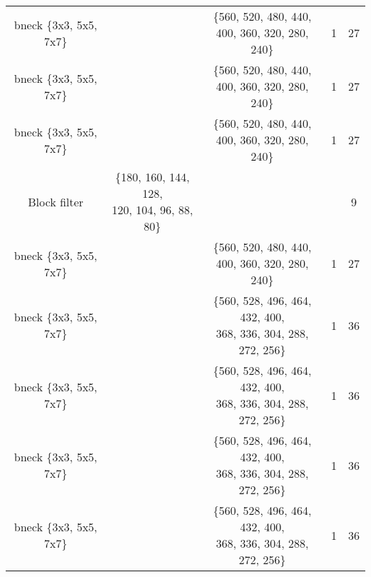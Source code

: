 \begin{table}
\begin{center}
\begin{tabular}[hp]{c|c|c|c|c}
  bneck \{3x3, 5x5, 7x7\} & &\shortstack{\{560, 520, 480, 440, \\ 400, 360, 320, 280, 240\}} &1 &27 \\
  bneck \{3x3, 5x5, 7x7\} & &\shortstack{\{560, 520, 480, 440, \\ 400, 360, 320, 280, 240\}} &1 &27 \\
  bneck \{3x3, 5x5, 7x7\} & &\shortstack{\{560, 520, 480, 440, \\ 400, 360, 320, 280, 240\}} &1 &27\\
\hline
Block filter &\shortstack{\{180, 160, 144, 128, \\ 120, 104, 96, 88, 80\}} & & &9\\
  bneck \{3x3, 5x5, 7x7\} & &\shortstack{\{560, 520, 480, 440, \\400, 360, 320, 280, 240\}} &1 &27\\
  bneck \{3x3, 5x5, 7x7\} & &\shortstack{\{560, 528, 496, 464, 432, 400, \\  368, 336, 304, 288, 272, 256\}} &1 &36 \\
  bneck \{3x3, 5x5, 7x7\} & &\shortstack{\{560, 528, 496, 464, 432, 400, \\ 368, 336, 304, 288, 272, 256\}} &1 &36 \\
  bneck \{3x3, 5x5, 7x7\} & &\shortstack{\{560, 528, 496, 464, 432, 400, \\ 368, 336, 304, 288, 272, 256\}} &1 &36 \\
  bneck \{3x3, 5x5, 7x7\} & &\shortstack{\{560, 528, 496, 464, 432, 400, \\ 368, 336, 304, 288, 272, 256\}} &1 &36 \\
\hline


\end{tabular}
\end{center}
\end{table}
